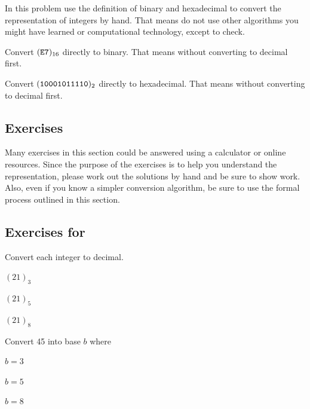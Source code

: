 \begin{act}
\label{act_bin_hex}
    In this problem use the definition of binary and hexadecimal to convert the representation of integers by hand. That means do not use other algorithms you might have learned or computational technology, except to check.
        \begin{actpart}
            \item Convert $(\texttt{E7})_{16}$ directly to binary.  That means without converting to decimal first.
            \item Convert $(\texttt{10001011110})_2$ directly to hexadecimal. That means without converting to decimal first. 
        \end{actpart}
\end{act}


\subsection{Exercises} 

Many exercises in this section could be answered using a calculator or online resources.  Since the purpose of the exercises is to help you understand the representation, please work out the solutions by hand and be sure to show work.  Also, even if you know a simpler conversion algorithm, be sure to use the formal process outlined in this section. 


\subsection*{Exercises for 
\subbaseb}

\begin{exer}[\exerP] %
\label{exer_conv_from_baseb}
   Convert each integer to decimal.
       \begin{exerpart}
           \item $(21)_3$
           \item $(21)_5$ 
           \item $(21)_8$
       \end{exerpart}
\end{exer}

\begin{exer}[\exerP] %
\label{exer_conv_to_baseb}
    Convert 45 into base $b$ where
        \begin{exerpart}
            \item $b=3$ 
            \item $b=5$ 
            \item $b=8$ 
        \end{exerpart}
\end{exer}

